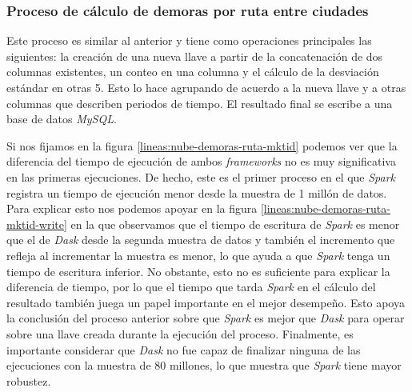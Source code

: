 \subsubsection{Proceso de cálculo de demoras por ruta entre ciudades}

Este proceso es similar al anterior y tiene como operaciones principales las siguientes: la creación de una nueva llave a partir de la concatenación de dos columnas existentes, un conteo en una columna y el cálculo de la desviación estándar en otras 5. Esto lo hace agrupando de acuerdo a la nueva llave y a otras columnas que describen periodos de tiempo. El resultado final se escribe a una base de datos \textit{MySQL}.

Si nos fijamos en la figura \ref{lineas:nube-demoras-ruta-mktid} podemos ver que la diferencia del tiempo de ejecución de ambos \textit{frameworks} no es muy significativa en las primeras ejecuciones. De hecho, este es el primer proceso en el que \textit{Spark} registra un tiempo de ejecución menor desde la muestra de 1 millón de datos. Para explicar esto nos podemos apoyar en la figura \ref{lineas:nube-demoras-ruta-mktid-write} en la que observamos que el tiempo de escritura de \textit{Spark} es menor que el de \textit{Dask} desde la segunda muestra de datos y también el incremento que refleja al incrementar la muestra es menor, lo que ayuda a que \textit{Spark} tenga un tiempo de escritura inferior. No obstante, esto no es suficiente para explicar la diferencia de tiempo, por lo que el tiempo que tarda \textit{Spark} en el cálculo del resultado también juega un papel importante en el mejor desempeño. Esto apoya la conclusión del proceso anterior sobre que \textit{Spark} es mejor que \textit{Dask} para operar sobre una llave creada durante la ejecución del proceso. Finalmente, es importante considerar que \textit{Dask} no fue capaz de finalizar ninguna de las ejecuciones con la muestra de 80 millones, lo que muestra que \textit{Spark} tiene mayor robustez.


